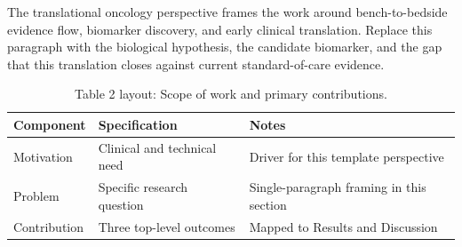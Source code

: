 
The translational oncology perspective frames the work around bench-to-bedside evidence flow, biomarker discovery, and early clinical translation. Replace this paragraph with the biological hypothesis, the candidate biomarker, and the gap that this translation closes against current standard-of-care evidence.

\begin{table}[H]
\caption{Table 2 layout: Scope of work and primary contributions.}
\label{tab:intro_overview}
\centering
\begin{tabular}{>{\raggedright\arraybackslash}p{3.4cm} >{\raggedright\arraybackslash}p{4.6cm} >{\raggedright\arraybackslash}p{5.4cm}}
\toprule
\textbf{Component} & \textbf{Specification} & \textbf{Notes} \\
\midrule
  Motivation & Clinical and technical need & Driver for this template perspective \\
  Problem & Specific research question & Single-paragraph framing in this section \\
  Contribution & Three top-level outcomes & Mapped to Results and Discussion \\
\bottomrule
\end{tabular}
\end{table}
